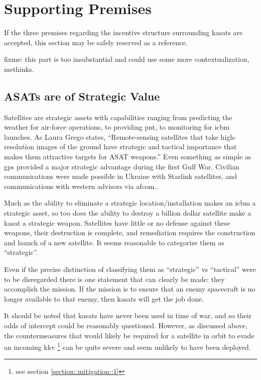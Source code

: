 \section{Supporting Premises}
\label{section::support}

If the three premises regarding the incentive structure surrounding
\acp{kasat} are accepted, this section may be safely reserved as a
reference.

fixme: this part is too insubstantial and could use some more
contextualization, methinks.

\subsection{ASATs are of Strategic Value}

Satellites are strategic assets with capabilities ranging from
predicting the weather for air-force operations, to providing
\ac{pnt}, to monitoring for \ac{icbm} launches.  As Laura Grego
states, ``Remote-sensing satellites that take high-resolution images
of the ground have strategic and tactical importance that makes them
attractive targets for ASAT weapons.''\cite[p16]{grego} Even something
as simple as \ac{gps} provided a major strategic advantage during the
first Gulf War.\cite{gps-gulf} Civilian communications were made
possible in Ukraine with Starlink satellites, and communications with
western advisors via \ac{afcom}.\cite{xxx}.

Much as the ability to eliminate a strategic location/installation
makes an \ac{icbm} a strategic asset, so too does the ability to
destroy a billion dollar satellite make a \ac{kasat} a strategic
weapon.  Satellites have little or no defense against these weapons,
their destruction is complete, and remediation requires the
construction and launch of a new satellite.  It seems reasonable to
categorize them as ``strategic''.

Even if the precise distinction of classifying them as ``strategic''
vs ``tactical'' were to be disregarded there is one statement that can
clearly be made: they accomplish the mission.  If the mission is to
ensure that an enemy spacecraft is no longer available to that enemy,
then \acp{kasat} will get the job done.

It should be noted that \acp{kasat} have never been used in time of
war\cite{brian}, and so their odds of intercept could be reasonably
questioned.  However, as discussed above, the countermeasures that
would likely be required for a satellite in orbit to evade an incoming
\ac{kkv} \footnote{see section \ref{section::mitigation::1}} can be
quite severe and seem unlikely to have been deployed.


